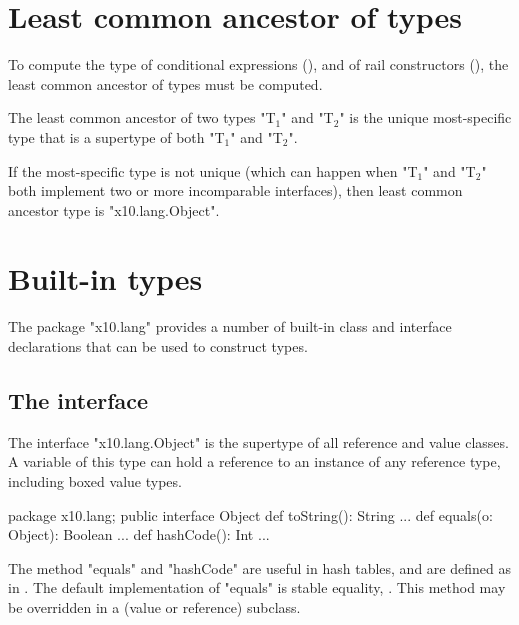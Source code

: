 \section{Least common ancestor of types}
\label{LCA}

To compute the type of conditional expressions
(),
and of rail constructors
(), the least common ancestor of types
must be computed.

The least common ancestor of two  types
\xcdmath"T$_1$" and \xcdmath"T$_2$"
is the
unique most-specific type
that is a supertype of both
\xcdmath"T$_1$" and \xcdmath"T$_2$".

If the most-specific type is not unique (which can happen when
\xcdmath"T$_1$" and \xcdmath"T$_2$" both implement two
or more incomparable interfaces), then
least common ancestor type is \xcd"x10.lang.Object".





\section{Built-in types}

The package \xcd"x10.lang" provides a number of built-in class and
interface declarations that can be used to construct types.

\subsection{The interface }
\label{Object}

The interface \xcd"x10.lang.Object" is the supertype of all
reference and value classes.
A variable of this type can hold a reference to an instance of any
reference type, including boxed value types.

\begin{xten}
package x10.lang;
public interface Object {
  def toString(): String {...}
  def equals(o: Object): Boolean {...}
  def hashCode(): Int {...}
}
\end{xten}

The method \xcd"equals" and \xcd"hashCode" are useful in hash tables,
and are defined as in \java. The default implementation of \xcd"equals"
is stable equality, . This method may be overridden
in a (value or reference) subclass.

